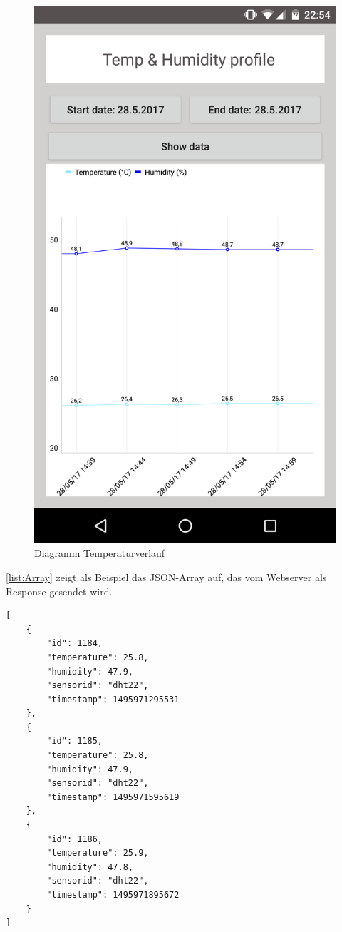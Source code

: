 \begin{figure}
	\centering
	\includegraphics[scale=0.1]{images/appVerlauf}
	\caption{Diagramm Temperaturverlauf}
	\label{label:temVerlauf}
\end{figure}

\autoref{list:Array} zeigt als Beispiel das \ac{JSON}-Array auf, das vom Webserver als Response gesendet wird. 
\begin{lstlisting}[label=list:Array, caption={Beispiel: JSON Array}]
[
	{
		"id": 1184,
		"temperature": 25.8,
		"humidity": 47.9,
		"sensorid": "dht22",
		"timestamp": 1495971295531
	},
	{
		"id": 1185,
		"temperature": 25.8,
		"humidity": 47.9,
		"sensorid": "dht22",
		"timestamp": 1495971595619
	},
	{
		"id": 1186,
		"temperature": 25.9,
		"humidity": 47.8,
		"sensorid": "dht22",
		"timestamp": 1495971895672
	}
]
\end{lstlisting}

